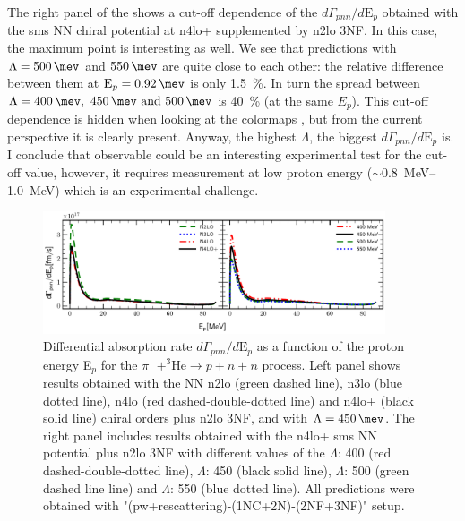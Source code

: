     The right panel of the  shows a cut-off dependence of the $d\Gamma_{pnn} /d\text{E}_p$ obtained
    with the \gls{sms} NN chiral potential at \gls{n4lo+} supplemented by \gls{n2lo} 3NF.
    In this case, the maximum point is interesting as well.
    We see that predictions with $\Lambda=\SI{500}{\mev}$ and $\SI{550}{\mev}$ are quite close to each other:
    the relative difference between them at $\text{E}_p = \SI{0.92}{\mev}$ is only \SI{1.5}{\percent}.
    In turn the spread between $\Lambda=\SIlist{400;450;500}{\mev}$ is \SI{40}{\percent} (at the same $E_p$).
    This cut-off dependence is hidden when looking at the colormaps 
    , but from the current perspective it is clearly present.
    Anyway, the highest $\Lambda$, the biggest $d\Gamma_{pnn} /d\text{E}_p$ is.
    I conclude that observable could be an interesting experimental test for the cut-off value, however, it requires measurement
    at low proton energy ($\sim$\SIrange{0.8}{1.0}{MeV}) which is an experimental challenge.

    \begin{figure}[h]
        \begin{center}
        \includegraphics[width=0.9\textwidth]{PlotData/PION/Dalitz_maps/figures/3HE_dGdEp.pdf}
        \end{center}
        \caption{Differential absorption rate $d\Gamma_{pnn} /d\text{E}_p$ 
        as a function of the proton energy E$_p$ for the 
        $\pi^- + ^3\text{He} \rightarrow p + n + n$ process.
        Left panel shows results obtained with the NN \gls{n2lo} (green dashed line),
        \gls{n3lo} (blue dotted line), \gls{n4lo} (red dashed-double-dotted line)
        and \gls{n4lo+} (black solid line) chiral orders plus \gls{n2lo} 3NF, and with $\Lambda = \SI{450}{\mev}$.
        The right panel includes results obtained with the \gls{n4lo+} \gls{sms} NN potential plus \gls{n2lo} 3NF
        with different values of the $\Lambda$: \SI{400}{\mev} (red dashed-double-dotted line),
        $\Lambda$: \SI{450}{\mev} (black solid line),
        $\Lambda$: \SI{500}{\mev} (green dashed line line) and
        $\Lambda$: \SI{550}{\mev} (blue dotted line).
        All predictions were obtained with "(\gls{pw}+rescattering)-(1NC+2N)-(2NF+3NF)" setup.}
        \label{pion_GdEp}
    \end{figure}

